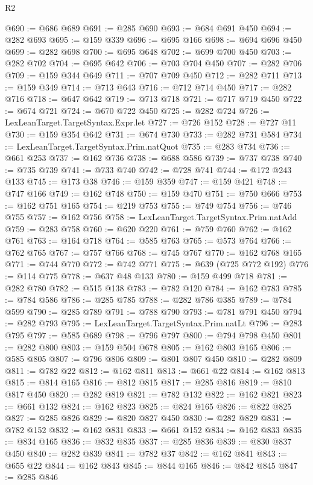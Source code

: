 \begin{lexlean}{R2}
\begin{coremodule}
@690 := @686 @689
@691 := @285 @690
@693 := @684 @691 @450
@694 := @282 @693
@695 := @159 @339
@696 := @695 @166
@698 := @694 @696 @450
@699 := @282 @698
@700 := @695 @648
@702 := @699 @700 @450
@703 := @282 @702
@704 := @695 @642
@706 := @703 @704 @450
@707 := @282 @706
@709 := @159 @344 @649
@711 := @707 @709 @450
@712 := @282 @711
@713 := @159 @349
@714 := @713 @643
@716 := @712 @714 @450
@717 := @282 @716
@718 := @647 @642
@719 := @713 @718
@721 := @717 @719 @450
@722 := @674 @721
@724 := @670 @722 @450
@725 := @282 @724
@726 := LexLeanTarget.TargetSyntax.Expr.let
@727 := @726 @152
@728 := @727 @11
@730 := @159 @354 @642
@731 := @674 @730
@733 := @282 @731 @584
@734 := LexLeanTarget.TargetSyntax.Prim.natQuot
@735 := @283 @734
@736 := @661 @253
@737 := @162 @736
@738 := @688 @586
@739 := @737 @738
@740 := @735 @739
@741 := @733 @740
@742 := @728 @741
@744 := @172 @243 @133
@745 := @173 @38
@746 := @159 @359
@747 := @159 @421
@748 := @747 @166
@749 := @162 @748
@750 := @159 @470
@751 := @750 @666
@753 := @162 @751 @165
@754 := @219 @753
@755 := @749 @754
@756 := @746 @755
@757 := @162 @756
@758 := LexLeanTarget.TargetSyntax.Prim.natAdd
@759 := @283 @758
@760 := @620 @220
@761 := @759 @760
@762 := @162 @761
@763 := @164 @718
@764 := @585 @763
@765 := @573 @764
@766 := @762 @765
@767 := @757 @766
@768 := @745 @767
@770 := @162 @768 @165
@771 := @744 @770
@772 := @742 @771
@775 := @639 (@725 @772 @192)
@776 := @114 @775
@778 := @637 @48 @133
@780 := @159 @499 @718
@781 := @282 @780
@782 := @515 @138
@783 := @782 @120
@784 := @162 @783
@785 := @784 @586
@786 := @285 @785
@788 := @282 @786 @385
@789 := @784 @599
@790 := @285 @789
@791 := @788 @790
@793 := @781 @791 @450
@794 := @282 @793
@795 := LexLeanTarget.TargetSyntax.Prim.natLt
@796 := @283 @795
@797 := @585 @689
@798 := @796 @797
@800 := @794 @798 @450
@801 := @282 @800
@803 := @159 @504 @678
@805 := @162 @803 @165
@806 := @585 @805
@807 := @796 @806
@809 := @801 @807 @450
@810 := @282 @809
@811 := @782 @22
@812 := @162 @811
@813 := @661 @22
@814 := @162 @813
@815 := @814 @165
@816 := @812 @815
@817 := @285 @816
@819 := @810 @817 @450
@820 := @282 @819
@821 := @782 @132
@822 := @162 @821
@823 := @661 @132
@824 := @162 @823
@825 := @824 @165
@826 := @822 @825
@827 := @285 @826
@829 := @820 @827 @450
@830 := @282 @829
@831 := @782 @152
@832 := @162 @831
@833 := @661 @152
@834 := @162 @833
@835 := @834 @165
@836 := @832 @835
@837 := @285 @836
@839 := @830 @837 @450
@840 := @282 @839
@841 := @782 @37
@842 := @162 @841
@843 := @655 @22
@844 := @162 @843
@845 := @844 @165
@846 := @842 @845
@847 := @285 @846

\end{coremodule}
\end{lexlean}
